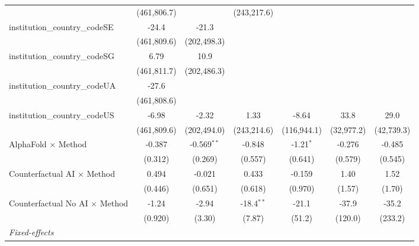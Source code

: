 \begin{tabular}{lcccccc}
                                         & (461,806.7)   &               & (243,217.6)   &               &            &   \\   
   institution\_country\_codeSE          & -24.4         & -21.3         &               &               &            &   \\   
                                         & (461,809.6)   & (202,498.3)   &               &               &            &   \\   
   institution\_country\_codeSG          & 6.79          & 10.9          &               &               &            &   \\   
                                         & (461,811.7)   & (202,486.3)   &               &               &            &   \\   
   institution\_country\_codeUA          & -27.6         &               &               &               &            &   \\   
                                         & (461,808.6)   &               &               &               &            &   \\   
   institution\_country\_codeUS          & -6.98         & -2.32         & 1.33          & -8.64         & 33.8       & 29.0\\   
                                         & (461,809.6)   & (202,494.0)   & (243,214.6)   & (116,944.1)   & (32,977.2) & (42,739.3)\\   
   AlphaFold $\times$ Method             & -0.387        & -0.569$^{**}$ & -0.848        & -1.21$^{*}$   & -0.276     & -0.485\\   
                                         & (0.312)       & (0.269)       & (0.557)       & (0.641)       & (0.579)    & (0.545)\\   
   Counterfactual AI $\times$ Method     & 0.494         & -0.021        & 0.433         & -0.159        & 1.40       & 1.52\\   
                                         & (0.446)       & (0.651)       & (0.618)       & (0.970)       & (1.57)     & (1.70)\\   
   Counterfactual No AI $\times$ Method  & -1.24         & -2.94         & -18.4$^{**}$  & -21.1         & -37.9      & -35.2\\   
                                         & (0.920)       & (3.30)        & (7.87)        & (51.2)        & (120.0)    & (233.2)\\   
   \midrule
   \emph{Fixed-effects}\\

\end{tabular}
